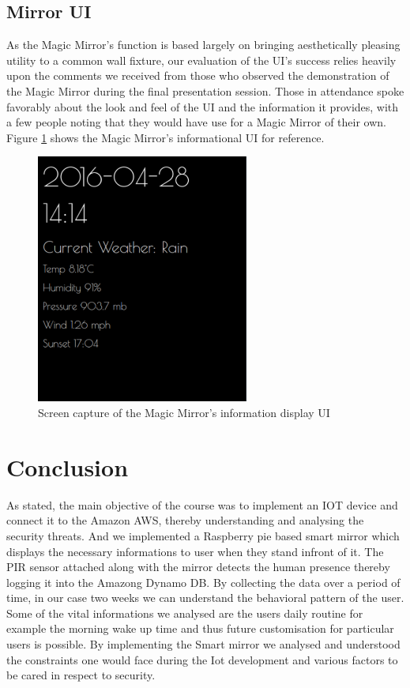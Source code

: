 \documentclass[conference]{IEEEtran}
\begin{document}
\subsection{Mirror UI}
As the Magic Mirror's function is based largely on bringing aesthetically pleasing utility to a common wall fixture, our evaluation of the UI's success relies heavily upon the comments we received from those who observed the demonstration of the Magic Mirror during the final presentation session.
Those in attendance spoke favorably about the look and feel of the UI and the information it provides, with a few people noting that they would have use for a Magic Mirror of their own.
Figure \ref{fig:mirrorui} shows the Magic Mirror's informational UI for reference.
\begin{figure}[!ht]
  \centering
  \includegraphics[width=2.75in]{images/mirror-ss.png}
  \caption{Screen capture of the Magic Mirror's information display UI}
  \label{fig:mirrorui}
\end{figure}


\section{Conclusion}

As stated, the main objective of the course was to implement an IOT device and connect it to the Amazon AWS, thereby understanding and analysing the security threats. And we implemented a Raspberry pie based smart mirror which displays the necessary informations to user when they stand infront of it. The PIR sensor attached along with the mirror detects the human presence thereby logging it into the Amazong Dynamo DB. By collecting the data over a period of time, in our case two weeks we can understand the behavioral pattern of the user. Some of the vital informations we analysed are the users daily routine for example the morning wake up time and thus future customisation for particular users is possible. By implementing the Smart mirror we analysed and understood the constraints one would face during the Iot development and various factors to be cared in respect to security.
\end{document}
